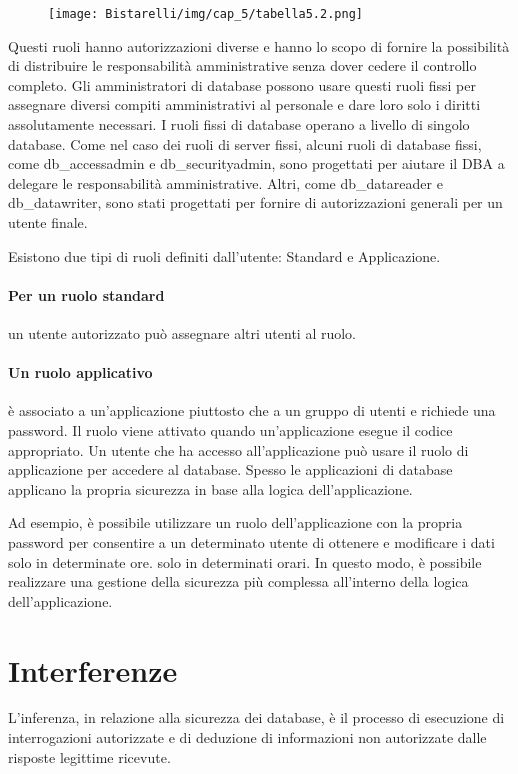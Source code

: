 \begin{figure}[H]
	\centering
    \texttt{[image: Bistarelli/img/cap\_5/tabella5.2.png]}
\end{figure}

Questi ruoli hanno autorizzazioni diverse e hanno lo scopo di fornire la possibilità di distribuire le responsabilità amministrative senza dover cedere il controllo completo. Gli amministratori di database possono usare questi ruoli fissi per assegnare diversi compiti amministrativi al personale e dare loro solo i diritti assolutamente necessari.
I ruoli fissi di database operano a livello di singolo database. Come nel caso dei ruoli di server fissi, alcuni ruoli di database fissi, come db\_accessadmin e db\_securityadmin, sono progettati per aiutare il DBA a delegare le responsabilità amministrative. Altri, come db\_datareader e db\_datawriter, sono stati progettati per fornire di autorizzazioni generali per un utente finale.

\singlespacing

Esistono due tipi di ruoli definiti dall'utente: Standard e Applicazione. 

\singlespacing

\paragraph{Per un ruolo standard} un utente autorizzato può assegnare altri utenti al ruolo.

\paragraph{Un ruolo applicativo} è associato a un'applicazione piuttosto che a un gruppo di utenti e richiede una password. Il ruolo viene attivato quando un'applicazione esegue il codice appropriato. Un utente che ha accesso all'applicazione può usare il ruolo di applicazione per accedere al database. Spesso le applicazioni di database applicano la propria sicurezza in base alla logica dell'applicazione. 

\singlespacing

Ad esempio, è possibile utilizzare un ruolo dell'applicazione con la propria password per consentire a un determinato utente di ottenere e modificare i dati solo in determinate ore. solo in determinati orari. In questo modo, è possibile realizzare una gestione della sicurezza più complessa all'interno della logica dell'applicazione.

\section{Interferenze}
L'inferenza, in relazione alla sicurezza dei database, è il processo di esecuzione di interrogazioni autorizzate e di deduzione di informazioni non autorizzate dalle risposte legittime ricevute.

